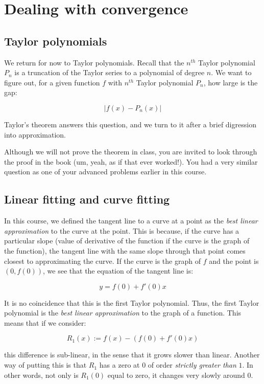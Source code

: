 \documentclass{amsart}
\begin{document}
\section{Dealing with convergence}

\subsection{Taylor polynomials}

We return for now to Taylor polynomials. Recall that the $n^{th}$
Taylor polynomial $P_n$ is a truncation of the Taylor series to a
polynomial of degree $n$. We want to figure out, for a given function
$f$ with $n^{th}$ Taylor polynomial $P_n$, how large is the gap:

$$|f(x) - P_n(x)|$$

Taylor's theorem answers this question, and we turn to it after a
brief digression into approximation.

Although we will not prove the theorem in class, you are invited to
look through the proof in the book (um, yeah, as if that ever
worked!). You had a very similar question as one of your advanced
problems earlier in this course.

\subsection{Linear fitting and curve fitting}

In this course, we defined the tangent line to a curve at a point as
the {\em best linear approximation} to the curve at the point. This is
because, if the curve has a particular slope (value of derivative of
the function if the curve is the graph of the function), the tangent
line with the same slope through that point comes closest to
approximating the curve. If the curve is the graph of $f$ and the
point is $(0,f(0))$, we see that the equation of the tangent line is:

$$y = f(0) + f'(0)x$$

It is no coincidence that this is the first Taylor polynomial. Thus,
the first Taylor polynomial is the {\em best linear approximation} to
the graph of a function. This means that if we consider:

$$R_1(x) := f(x) - (f(0) + f'(0)x)$$

this difference is sub-linear, in the sense that it grows slower than
linear. Another way of putting this is that $R_1$ has a zero at $0$ of
order {\em strictly greater than} $1$. In other words, not only is
$R_1(0)$ equal to zero, it changes very slowly around $0$.
\end{document}

